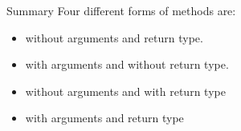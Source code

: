 \documentclass[aspectratio=169,14pt,usenames,dvipsnames]{beamer}
\begin{document}
\begin{frame}{Summary}
Four different forms of methods are:\\
\begin{itemize}
    \item without arguments and return type.

\item with arguments and without return type.
\item without arguments and with return type
\item with arguments and return type
\end{itemize}
\end{frame}
\end{document}
